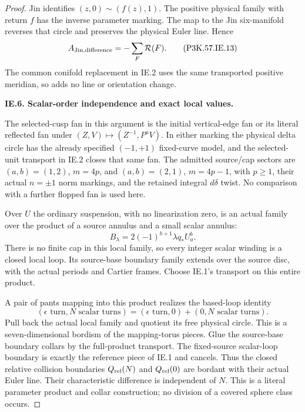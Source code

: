 \begin{proof}
Jin identifies \((z,0)\sim(f(z),1)\).
The positive physical family with return
\(f\) has the inverse parameter marking.
The map to the Jin six-manifold reverses
that circle and preserves the physical
Euler line. Hence
\[
                  A_{\rm Jin,difference}
                           =-\sum_F\mathcal R(F).         \tag{P3K.57.IE.13}
\]
The common conifold replacement in IE.2
uses the same transported positive
meridian, so adds no line or orientation
change.

\par\medskip\noindent\textbf{IE.6. Scalar-order independence and exact local values.}\par\nopagebreak[4]

The selected-cusp fan in this argument is the initial
vertical-edge fan or its literal reflected fan under
\((Z,V)\mapsto(Z^{-1},P^aV)\). In either marking the
physical delta circle has the already specified
\((-1,+1)\) fixed-curve model, and the selected-unit
transport in IE.2 closes that same fan. The admitted
source/cap sectors are \((a,b)=(1,2)\), \(m=4p\),
and \((a,b)=(2,1)\), \(m=4p-1\), with \(p\ge1\),
their actual \(n=\pm1\) norm markings, and the
retained integral \(d\delta\) twist. No comparison
with a further flopped fan is used here.

Over \(U\) the ordinary suspension, with
no linearization zero, is an actual family
over the product of a source annulus and
a small scalar annulus:
\[
                   B_\lambda=2(-1)^{b+1}\lambda q_*U_a^b.
\]
There is no finite cap in this local
family, so every integer scalar winding
is a closed local loop. Its source-base
boundary family extends over the source
disc, with the actual periods and Cartier
frames. Choose IE.1's transport on this
entire product.

A pair of pants mapping into this
product realizes the based-loop identity
\[
 (\epsilon\text{ turn},N\text{ scalar turns})
   =(\epsilon\text{ turn},0)+(0,N\text{ scalar turns}).    \tag{P3K.57.IE.14}
\]
Pull back the actual local family and
quotient its free physical circle.
This is a seven-dimensional bordism
of the mapping-torus pieces. Glue the
source-base boundary collars by the
full-product transport. The fixed-source
scalar-loop boundary is exactly the
reference piece of IE.1 and cancels.
Thus the closed relative collision
boundaries \(Q_{\rm rel}(N)\) and
\(Q_{\rm rel}(0)\) are bordant with
their actual Euler line. Their
characteristic difference is independent
of \(N\). This is a literal parameter
product and collar construction; no
division of a covered sphere class occurs.


\end{proof}
